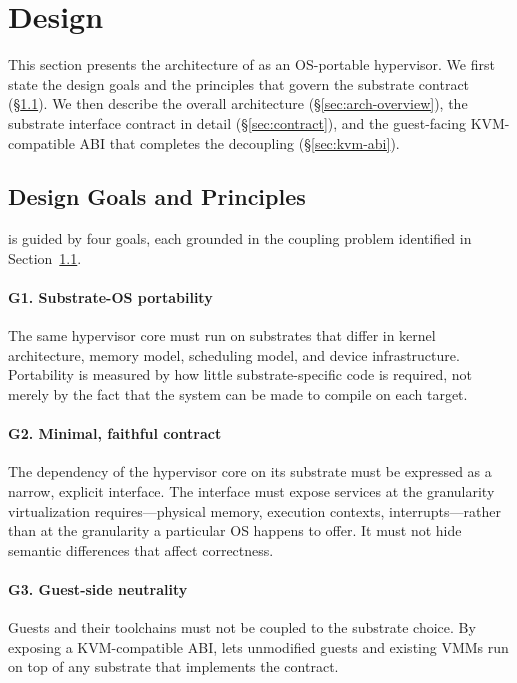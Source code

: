 \section{Design}

This section presents the architecture of \axvisor{} as an OS-portable
hypervisor. We first state the design goals and the principles that govern the
substrate contract (\S\ref{sec:design-goals}). We then describe the overall
architecture (\S\ref{sec:arch-overview}), the substrate interface contract in
detail (\S\ref{sec:contract}), and the guest-facing KVM-compatible ABI that
completes the decoupling (\S\ref{sec:kvm-abi}).

\subsection{Design Goals and Principles}
\label{sec:design-goals}

\axvisor{} is guided by four goals, each grounded in the coupling problem
identified in Section~\ref{sec:design-goals}.

\paragraph{G1. Substrate-OS portability}
The same hypervisor core must run on substrates that differ in kernel
architecture, memory model, scheduling model, and device infrastructure.
Portability is measured by how little substrate-specific code is required, not
merely by the fact that the system can be made to compile on each target.

\paragraph{G2. Minimal, faithful contract}
The dependency of the hypervisor core on its substrate must be expressed as a
narrow, explicit interface. The interface must expose services at the
granularity virtualization requires---physical memory, execution contexts,
interrupts---rather than at the granularity a particular OS happens to offer. It
must not hide semantic differences that affect correctness.

\paragraph{G3. Guest-side neutrality}
Guests and their toolchains must not be coupled to the substrate choice. By
exposing a KVM-compatible ABI, \axvisor{} lets unmodified guests and existing
VMMs run on top of any substrate that implements the contract.

